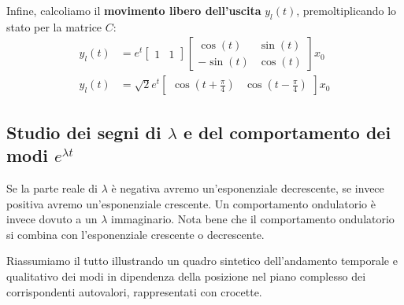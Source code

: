 \documentclass[a4paper,12pt]{article}
\begin{document}
	Infine, calcoliamo il \textbf{movimento libero dell'uscita} $y_l(t)$, premoltiplicando lo stato per la matrice $C$:
	\begin{align*}
		y_l(t) &= e^t \begin{bmatrix} 1 & 1 \end{bmatrix} \begin{bmatrix} \cos(t) & \sin(t) \\ -\sin(t) & \cos(t) \end{bmatrix} x_0 \\[10pt]
		y_l(t) &= \sqrt{2} e^t \begin{bmatrix} \cos\left(t + \frac{\pi}{4}\right) & \cos\left(t - \frac{\pi}{4}\right) \end{bmatrix} x_0
	\end{align*}
	\subsection{Studio dei segni di \texorpdfstring{$\lambda$}{lambda} e del comportamento dei modi \texorpdfstring{$e^{\lambda t}$}{e\textasciicircum\{lambda t\}}}
	
	Se la parte reale di $\lambda$ è negativa avremo un'esponenziale decrescente, se invece positiva avremo un'esponenziale crescente. Un comportamento ondulatorio è invece dovuto a un $\lambda$ immaginario. Nota bene che il comportamento ondulatorio si combina con l'esponenziale crescente o decrescente.
	
	Riassumiamo il tutto illustrando un quadro sintetico dell'andamento temporale e qualitativo dei modi in dipendenza della posizione nel piano complesso dei corrispondenti autovalori, rappresentati con crocette.
	
	\vspace{0.8cm}
	
\end{document}
